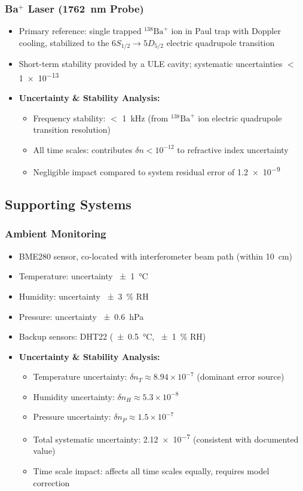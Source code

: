 \documentclass[aps,prl,reprint,groupedaddress,onecolumn,superscriptaddress]{revtex4-2}
\begin{document}
\subsubsection{Ba$^+$ Laser (\SI{1762}{\nano\meter} Probe)}
\begin{itemize}
    \item Primary reference: single trapped $^{138}\text{Ba}^+$ ion in Paul trap with Doppler cooling, stabilized to the $6S_{1/2} \rightarrow 5D_{5/2}$ electric quadrupole transition
    \item Short-term stability provided by a ULE cavity; systematic uncertainties $<$ \num{1e-13}
    \item \textbf{Uncertainty \& Stability Analysis:}
    \begin{itemize}
        \item Frequency stability: $<$ \SI{1}{\kilo\hertz} (from $^{138}\text{Ba}^+$ ion electric quadrupole transition resolution)
        \item All time scales: contributes $\delta n < 10^{-12}$ to refractive index uncertainty
        \item Negligible impact compared to system residual error of \num{1.2e-9}
    \end{itemize}
\end{itemize}

\subsection{Supporting Systems}

\subsubsection{Ambient Monitoring}
\begin{itemize}
    \item BME280 sensor, co-located with interferometer beam path (within \SI{10}{\centi\meter})
    \item Temperature: uncertainty \SI{\pm 1}{\degreeCelsius}
    \item Humidity: uncertainty \SI{\pm 3}{\percent} RH
    \item Pressure: uncertainty \SI{\pm 0.6}{\hecto\pascal}
    \item Backup sensors: DHT22 (\SI{\pm 0.5}{\degreeCelsius}, \SI{\pm 1}{\percent} RH)
    \item \textbf{Uncertainty \& Stability Analysis:}
    \begin{itemize}
        \item Temperature uncertainty: $\delta n_T \approx 8.94\times10^{-7}$ (dominant error source)
        \item Humidity uncertainty: $\delta n_H \approx 5.3\times10^{-8}$
        \item Pressure uncertainty: $\delta n_P \approx 1.5\times10^{-7}$
        \item Total systematic uncertainty: \num{2.12e-7} (consistent with documented value)
        \item Time scale impact: affects all time scales equally, requires model correction
    \end{itemize}
\end{itemize}
\end{document}

